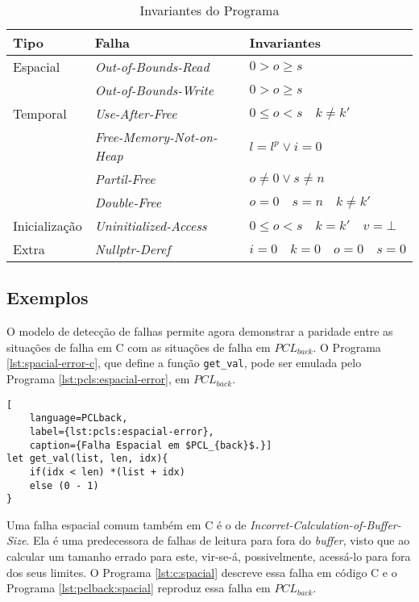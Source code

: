 \begin{table}[ht]
	\centering
	\caption{Invariantes do Programa}
	\label{table:invariants}
	\begin{tabular}{lll}
		\toprule 
		Tipo & Falha & Invariantes \\
		\midrule
		Espacial	& \emph{Out-of-Bounds-Read} & $0 > o \ge s$ \\
		 			& \emph{Out-of-Bounds-Write} & $0 > o \ge s$ \\
		Temporal 	& \emph{Use-After-Free} & $0 \le o < s \quad k \neq k'$\\
		 			& \emph{Free-Memory-Not-on-Heap} & $l = l^p \lor i = 0$ \\
		 			& \emph{Partil-Free} & $o \neq 0 \lor s \neq n$ \\
		 			& \emph{Double-Free} & $o = 0 \quad s = n \quad k \neq k'$ \\
		Inicialização 	& \emph{Uninitialized-Access} & $0 \le o < s \quad k = k' \quad v = \bot$  \\
		Extra 	    & \emph{Nullptr-Deref} & $i = 0 \quad k = 0 \quad o = 0 \quad s = 0$  \\
		\bottomrule
	\end{tabular}
\end{table}
\FloatBarrier

\subsection{Exemplos}

O modelo de detecção de falhas permite agora demonstrar a paridade entre as situações de falha em C com as situações de falha em $PCL_{back}$. O Programa \ref{lst:spacial-error-c}, que define a função \lstinline[language=C]|get_val|, pode ser emulada pelo Programa \ref{lst:pcls:espacial-error}, em $PCL_{back}$.

\begin{lstlisting}[
	language=PCLback, 
	label={lst:pcls:espacial-error}, 
	caption={Falha Espacial em $PCL_{back}$.}]
let get_val(list, len, idx){
	if(idx < len) *(list + idx)
	else (0 - 1)
}
\end{lstlisting}

Uma falha espacial comum também em C é o de \emph{Incorret-Calculation-of-Buffer-Size}. Ela é uma predecessora de falhas de leitura para fora do \emph{buffer}, visto que ao calcular um tamanho errado para este, vir-se-á, possivelmente, acessá-lo para fora dos seus limites. O Programa \ref{lst:c:spacial} descreve essa falha em código C e o Programa \ref{lst:pclback:spacial} reproduz essa falha em $PCL_{back}$.



